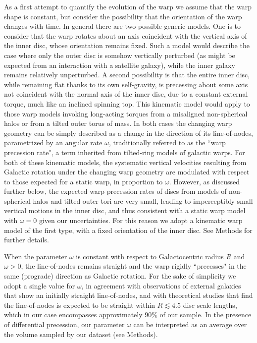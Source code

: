 \documentclass{nature}
\begin{document}
As a first attempt to quantify the evolution of the warp we assume that the warp shape is constant, but consider the possibility that the orientation of the warp changes with time. In general there are two possible generic models. One is to consider that the warp rotates about an axis coincident with the vertical axis of the inner disc, whose orientation remains fixed. Such a model would describe the case where only the outer disc is somehow vertically perturbed (as might be expected from an interaction with a satellite galaxy), while the inner galaxy remains relatively unperturbed. A second possibility is that the entire inner disc, while remaining flat thanks to its own self-gravity, is precessing about some axis not coincident with the normal axis of the inner disc, due to a constant external torque, much like an inclined spinning top. This kinematic model would apply to those warp models invoking long-acting torques from a misaligned non-spherical halos or from a tilted outer torus of mass. In both cases the changing warp geometry can be simply described as a change in the direction of its line-of-nodes, parametrized by an angular rate $\omega$, traditionally referred to as the ``warp precession rate", a term inherited from tilted-ring models of galactic warps\cite{Sparke:1988}. For both of these kinematic models, the systematic vertical velocities resulting from Galactic rotation under the changing warp geometry are modulated with respect to those expected for a static warp, in proportion to $\omega$. However, as discussed further below, the expected warp precession rates of discs from models of non-spherical halos and tilted outer tori are very small, leading to imperceptibly small vertical motions in the inner disc, and thus consistent with a static warp model with $\omega=0$ given our uncertainties. For this reason we adopt a kinematic warp model of the first type, with a fixed orientation of the inner disc. See Methods for further details.

When the parameter $\omega$ is constant with respect to Galactocentric radius $R$ and $\omega>0$, the line-of-nodes remains straight and the warp rigidly ``precesses" in the same (prograde) direction as Galactic rotation. For the sake of simplicity we adopt a single value for $\omega$, in agreement with observations of external galaxies that show an initially straight line-of-nodes\cite{Briggs:1990}, and with theoretical studies that find the line-of-nodes is expected to be straight within  $R \lesssim 4.5$ disc scale lengths\cite{Shen:2006,BlandGerhard:2016}, which in our case encompasses approximately 90\% of our sample. In the presence of differential precession, our parameter $\omega$ can be interpreted as an average over the volume sampled by our dataset (see Methods).
\end{document}
